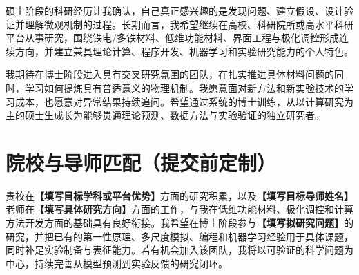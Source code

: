 硕士阶段的科研经历让我确认，自己真正感兴趣的是发现问题、建立假设、设计验证并理解微观机制的过程。长期而言，我希望继续在高校、科研院所或高水平科研平台从事研究，围绕铁电/多铁材料、低维功能材料、界面工程与极化调控形成连续方向，并建立兼具理论计算、程序开发、机器学习和实验研究能力的个人特色。

我期待在博士阶段进入具有交叉研究氛围的团队，在扎实推进具体材料问题的同时，学习如何提炼具有普适意义的物理机制。我愿意面对新方法和新实验技术的学习成本，也愿意对异常结果持续追问。希望通过系统的博士训练，从以计算研究为主的硕士生成长为能够贯通理论预测、数据方法与实验验证的独立研究者。

\section{院校与导师匹配（提交前定制）}

贵校在\textbf{【填写目标学科或平台优势】}方面的研究积累，以及\textbf{【填写目标导师姓名】}老师在\textbf{【填写具体研究方向】}方面的工作，与我在低维功能材料、极化调控和计算方法开发方面的基础具有良好衔接。我希望在博士阶段参与\textbf{【填写拟研究问题】}的研究，并把已有的第一性原理、多尺度模拟、编程和机器学习经验用于具体课题，同时补足实验制备与表征能力。若有机会加入该团队，我将以可验证的科学问题为中心，持续完善从模型预测到实验反馈的研究闭环。